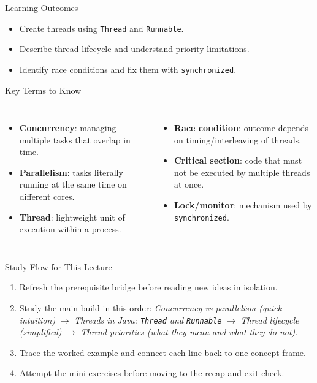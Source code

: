 \documentclass{beamer}
\begin{document}
\begin{frame}{Learning Outcomes}
  \begin{itemize}[<+->]
    \item Create threads using \texttt{Thread} and \texttt{Runnable}.
    \item Describe thread lifecycle and understand priority limitations.
    \item Identify race conditions and fix them with \texttt{synchronized}.
  \end{itemize}
  \slidesources{\OOPSUnitIIISources}
\end{frame}

\begin{frame}{Key Terms to Know}
\small
\begin{columns}[t]
\begin{itemize}
  \item \textbf{Concurrency}: managing multiple tasks that overlap in time.
  \item \textbf{Parallelism}: tasks literally running at the same time on different cores.
  \item \textbf{Thread}: lightweight unit of execution within a process.
\end{itemize}
\begin{itemize}
  \item \textbf{Race condition}: outcome depends on timing/interleaving of threads.
  \item \textbf{Critical section}: code that must not be executed by multiple threads at once.
  \item \textbf{Lock/monitor}: mechanism used by \texttt{synchronized}.
\end{itemize}
\end{columns}
  \slidesources{\OOPSUnitIIISources}
\end{frame}

\begin{frame}{Study Flow for This Lecture}
\begin{enumerate}[<+->]
  \item Refresh the prerequisite bridge before reading new ideas in isolation.
  \item Study the main build in this order: \textit{Concurrency vs parallelism (quick intuition)} $\rightarrow$ \textit{Threads in Java: \texttt{Thread} and \texttt{Runnable}} $\rightarrow$ \textit{Thread lifecycle (simplified)} $\rightarrow$ \textit{Thread priorities (what they mean and what they do not)}.
  \item Trace the worked example and connect each line back to one concept frame.
  \item Attempt the mini exercises before moving to the recap and exit check.
\end{enumerate}
  \slidesources{\OOPSUnitIIISources}
\end{frame}
\end{document}
